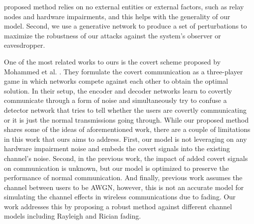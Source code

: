 proposed method relies on no external entities or external factors, such as relay nodes and hardware impairments, and this helps with the generality of our model. Second, we use a generative network to produce a set of perturbations to maximize the robustness of our attacks against the system's observer or eavesdropper. 

One of the most related works to ours is the covert scheme proposed by Mohammed et al. \cite{mohammed2021adversarial}. They formulate the covert communication as a three-player game in which networks compete against each other to obtain the optimal solution. In their setup, the encoder and decoder networks learn to covertly communicate through a form of noise and simultaneously try to confuse a detector network that tries to tell whether the users are covertly communicating or it is just the normal transmissions going through. While our proposed method shares some of the ideas of aforementioned work, there are a couple of limitations in this work that ours aims to address. First, our model is not leveraging on any hardware impairment noise and embeds the covert signals into the existing channel's noise. Second, in the previous work, the impact of added covert signals on communication is unknown, but our model is optimized to preserve the performance of normal communication. And finally, previous work assumes the channel between users to be AWGN, however, this is not an accurate model for simulating the channel effects in wireless communications due to fading. Our work addresses this by proposing a robust method against different channel models including Rayleigh and Rician fading.